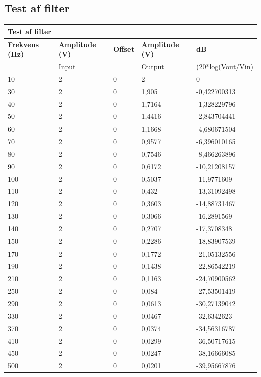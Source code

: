 \subsection{Test af filter}
\vspace{0.5 cm}
\begin{table}[h!]
	\begin{tabular}{l|l|l|l|l}
		\multicolumn{5}{l}{\textbf{Test af filter}} \\
		\hline
		\textbf{Frekvens (Hz)} & \textbf{Amplitude (V)} & \textbf{Offset} & \textbf{Amplitude (V)} & \textbf{dB} \\
		& Input &  & Output & (20*log(Vout/Vin) \\
		\hline
		10 & 2 & 0 & 2 & 0 \\
		\hline
		30 & 2 & 0 & 1,905 & -0,422700313 \\
		\hline
		40 & 2 & 0 & 1,7164 & -1,328229796 \\
		\hline
		50 & 2 & 0 & 1,4416 & -2,843704441 \\
		\hline
		60 & 2 & 0 & 1,1668 & -4,680671504 \\
		\hline
		70 & 2 & 0 & 0,9577 & -6,396010165 \\
		\hline
		80 & 2 & 0 & 0,7546 & -8,466263896 \\
		\hline
		90 & 2 & 0 & 0,6172 & -10,21208157 \\
		\hline
		100 & 2 & 0 & 0,5037 & -11,9771609 \\
		\hline
		110 & 2 & 0 & 0,432 & -13,31092498 \\
		\hline
		120 & 2 & 0 & 0,3603 & -14,88731467 \\
		\hline
		130 & 2 & 0 & 0,3066 & -16,2891569 \\
		\hline
		140 & 2 & 0 & 0,2707 & -17,3708348 \\
		\hline
		150 & 2 & 0 & 0,2286 & -18,83907539 \\
		\hline
		170 & 2 & 0 & 0,1772 & -21,05132556 \\
		\hline
		190 & 2 & 0 & 0,1438 & -22,86542219 \\
		\hline
		210 & 2 & 0 & 0,1163 & -24,70900562 \\
		\hline
		250 & 2 & 0 & 0,084 & -27,53501419 \\
		\hline
		290 & 2 & 0 & 0,0613 & -30,27139042 \\
		\hline
		330 & 2 & 0 & 0,0467 & -32,6342623 \\
		\hline
		370 & 2 & 0 & 0,0374 & -34,56316787 \\
		\hline
		410 & 2 & 0 & 0,0299 & -36,50717615 \\
		\hline
		450 & 2 & 0 & 0,0247 & -38,16666085 \\
		\hline
		500 & 2 & 0 & 0,0201 & -39,95667876
	\end{tabular}
\end{table}